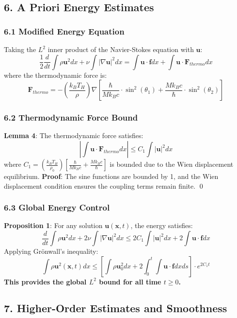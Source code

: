 ﻿\documentclass[12pt]{article}
\begin{document}
\subsection{6. A Priori Energy Estimates}
\subsubsection{6.1 Modified Energy Equation}
Taking the $L^2$ inner product of the Navier-Stokes equation with $\mathbf{u}$:
$$\frac{1}{2}\frac{d}{dt} \int\rho\mathbf{u}^2 dx + \nu\int|\nabla\mathbf{u}|^2 dx = \int\mathbf{u}\cdot\mathbf{f} dx + \int\mathbf{u}\cdot\mathbf{F}_{thermo} dx$$
where the thermodynamic force is:
$$\mathbf{F}_{thermo} = -\left(\frac{k_B T_H}{\rho}\right)\nabla\left[\frac{\hbar}{Mk_Bc}\cdot\sin^2(\theta_1) + \frac{Mk_Bc}{\hbar}\cdot\sin^2(\theta_2)\right]$$

\subsubsection{6.2 Thermodynamic Force Bound}
\textbf{Lemma 4}: The thermodynamic force satisfies:
$$\left|\int\mathbf{u}\cdot\mathbf{F}_{thermo} dx\right| \le C_1\int|\mathbf{u}|^2 dx$$
where $C_1 = \left(\frac{k_B T_H}{\rho_0}\right)\left[\frac{\hbar}{Mk_Bc} + \frac{Mk_Bc}{\hbar}\right]$ is bounded due to the Wien displacement equilibrium.
\textbf{Proof}: The sine functions are bounded by 1, and the Wien displacement condition ensures the coupling terms remain finite. \qed

\subsubsection{6.3 Global Energy Control}
\textbf{Proposition 1}: For any solution $\mathbf{u}(\mathbf{x},t)$, the energy satisfies:
$$\frac{d}{dt} \int\rho\mathbf{u}^2 dx + 2\nu\int|\nabla\mathbf{u}|^2 dx \le 2C_1\int|\mathbf{u}|^2 dx + 2\int\mathbf{u}\cdot\mathbf{f} dx$$
Applying Grönwall's inequality:
$$\int\rho\mathbf{u}^2(\mathbf{x},t) dx \le \left[\int\rho\mathbf{u}_0^2 dx + 2\int_0^t\int\mathbf{u}\cdot\mathbf{f} dx ds\right]\cdot e^{2C_1t}$$
\textbf{This provides the global $L^2$ bound for all time $t \ge 0$.}

\subsection{7. Higher-Order Estimates and Smoothness}
\end{document}
